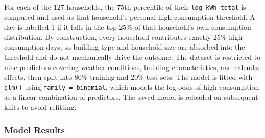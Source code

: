 \documentclass[
]{article}
\begin{document}
For each of the 127 households, the 75th percentile of their
\texttt{log\_kWh\_total} is computed and used as that household's
personal high-consumption threshold. A day is labelled 1 if it falls in
the top 25\% of that household's own consumption distribution. By
construction, every household contributes exactly 25\% high-consumption
days, so building type and household size are absorbed into the
threshold and do not mechanically drive the outcome. The dataset is
restricted to nine predictors covering weather conditions, building
characteristics, and calendar effects, then split into 80\% training and
20\% test sets. The model is fitted with \texttt{glm()} using
\texttt{family\ =\ binomial}, which models the log-odds of high
consumption as a linear combination of predictors. The saved model is
reloaded on subsequent knits to avoid refitting.

\subsubsection{Model Results}\label{model-results-2}
\end{document}
